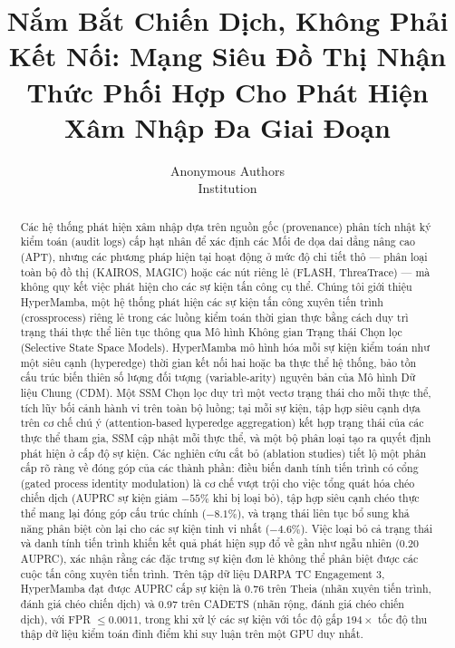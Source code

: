 \documentclass[letterpaper,twocolumn,10pt]{article}
\begin{document}
\date{}

\title{\Large \bf Nắm Bắt Chiến Dịch, Không Phải Kết Nối: Mạng Siêu Đồ Thị Nhận Thức Phối Hợp Cho Phát Hiện Xâm Nhập Đa Giai Đoạn}

\author{
{\rm Anonymous Authors}\\
Institution
}
\maketitle

\begin{abstract}
Các hệ thống phát hiện xâm nhập dựa trên nguồn gốc (provenance) phân tích nhật ký kiểm toán (audit logs) cấp hạt nhân để xác định các Mối đe dọa dai dẳng nâng cao (APT), nhưng các phương pháp hiện tại hoạt động ở mức độ chi tiết thô --- phân loại toàn bộ đồ thị (KAIROS, MAGIC) hoặc các nút riêng lẻ (FLASH, ThreaTrace) --- mà không quy kết việc phát hiện cho các sự kiện tấn công cụ thể. Chúng tôi giới thiệu HyperMamba, một hệ thống phát hiện các sự kiện tấn công xuyên tiến trình (crossprocess) riêng lẻ trong các luồng kiểm toán thời gian thực bằng cách duy trì trạng thái thực thể liên tục thông qua Mô hình Không gian Trạng thái Chọn lọc (Selective State Space Models). HyperMamba mô hình hóa mỗi sự kiện kiểm toán như một siêu cạnh (hyperedge) thời gian kết nối hai hoặc ba thực thể hệ thống, bảo tồn cấu trúc biến thiên số lượng đối tượng (variable-arity) nguyên bản của Mô hình Dữ liệu Chung (CDM). Một SSM Chọn lọc duy trì một vectơ trạng thái cho mỗi thực thể, tích lũy bối cảnh hành vi trên toàn bộ luồng; tại mỗi sự kiện, tập hợp siêu cạnh dựa trên cơ chế chú ý (attention-based hyperedge aggregation) kết hợp trạng thái của các thực thể tham gia, SSM cập nhật mỗi thực thể, và một bộ phân loại tạo ra quyết định phát hiện ở cấp độ sự kiện. Các nghiên cứu cắt bỏ (ablation studies) tiết lộ một phân cấp rõ ràng về đóng góp của các thành phần: điều biến danh tính tiến trình có cổng (gated process identity modulation) là cơ chế vượt trội cho việc tổng quát hóa chéo chiến dịch (AUPRC sự kiện giảm $-55\%$ khi bị loại bỏ), tập hợp siêu cạnh chéo thực thể mang lại đóng góp cấu trúc chính ($-8.1\%$), và trạng thái liên tục bổ sung khả năng phân biệt còn lại cho các sự kiện tinh vi nhất ($-4.6\%$). Việc loại bỏ cả trạng thái và danh tính tiến trình khiến kết quả phát hiện sụp đổ về gần như ngẫu nhiên ($0.20$ AUPRC), xác nhận rằng các đặc trưng sự kiện đơn lẻ không thể phân biệt được các cuộc tấn công xuyên tiến trình. Trên tập dữ liệu DARPA TC Engagement 3, HyperMamba đạt được AUPRC cấp sự kiện là 0.76 trên Theia (nhãn xuyên tiến trình, đánh giá chéo chiến dịch) và 0.97 trên CADETS (nhãn rộng, đánh giá chéo chiến dịch), với FPR $\leq 0.0011$, trong khi xử lý các sự kiện với tốc độ gấp $194\times$ tốc độ thu thập dữ liệu kiểm toán đỉnh điểm khi suy luận trên một GPU duy nhất.
\end{abstract}
\end{document}
